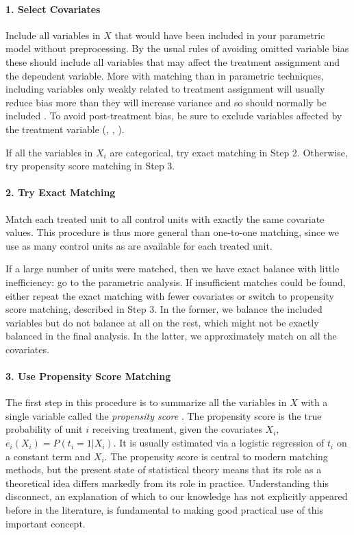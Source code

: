 \documentclass[11pt,titlepage]{article}
\begin{document}
\paragraph{1. Select Covariates}  
Include all variables in $X$ that would have been included in your
parametric model without preprocessing.  By the usual rules of
avoiding omitted variable bias these should include all variables that
may affect the treatment assignment and the dependent variable.  More
with matching than in parametric techniques, including variables only
weakly related to treatment assignment will usually reduce bias more
than they will increase variance and so should normally be included
\citep{RubTho96, HecIchSmi98}.  To avoid post-treatment bias, be sure to
exclude variables affected by the treatment variable (\cite{FraRub02},
\cite{Greenland03}, \citet{KinZen04}).

If all the variables in $X_i$ are categorical, try exact matching in
Step 2.  Otherwise, try propensity score matching in Step 3.
  
\paragraph{2. Try Exact Matching}  
Match each treated unit to all control units with exactly the same
covariate values.  This procedure is thus more general than one-to-one
matching, since we use as many control units as are available for each
treated unit.

If a large number of units were matched, then we have exact
balance with little inefficiency: go to the parametric analysis.  If
insufficient matches could be found, either repeat the exact matching
with fewer covariates or switch to propensity score matching,
described in Step 3.  In the former, we balance the included variables
but do not balance at all on the rest, which might not be exactly
balanced in the final analysis.  In the latter, we approximately match
on all the covariates.

\paragraph{3. Use Propensity Score Matching}  
The first step in this procedure is to summarize all the variables in
$X$ with a single variable called the \emph{propensity score}
\cite{RosRub83}.  The propensity score is the true probability of
unit $i$ receiving treatment, given the covariates $X_i$, $e_i(X_i) =
P(t_i=1 | X_i)$.  It is usually estimated via a logistic regression of
$t_i$ on a constant term and $X_i$.  The propensity score is central
to modern matching methods, but the present state of statistical
theory means that its role as a theoretical idea differs markedly from
its role in practice.  Understanding this disconnect, an explanation
of which to our knowledge has not explicitly appeared before in the
literature, is fundamental to making good practical use of this
important concept.
\end{document}
